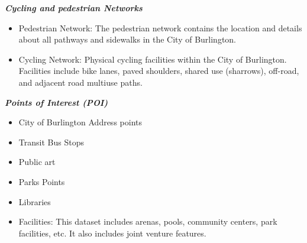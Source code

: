 \documentclass[12pt,twoside]{reedthesis}
\begin{document}
\textbf{\emph{Cycling and pedestrian Networks}}
\begin{itemize}
\item
  Pedestrian Network: The pedestrian network contains the location and details about all pathways and sidewalks in the City of Burlington.
\item
  Cycling Network: Physical cycling facilities within the City of Burlington. Facilities include bike lanes, paved shoulders, shared use (sharrows), off-road, and adjacent road multiuse paths.
\end{itemize}
\textbf{\emph{Points of Interest (POI)}}
\begin{itemize}
\item
  City of Burlington Address points
\item
  Transit Bus Stops
\item
  Public art
\item
  Parks Points
\item
  Libraries
\item
  Facilities: This dataset includes arenas, pools, community centers, park facilities, etc. It also includes joint venture features.
\end{itemize}
\newpage
\end{document}
